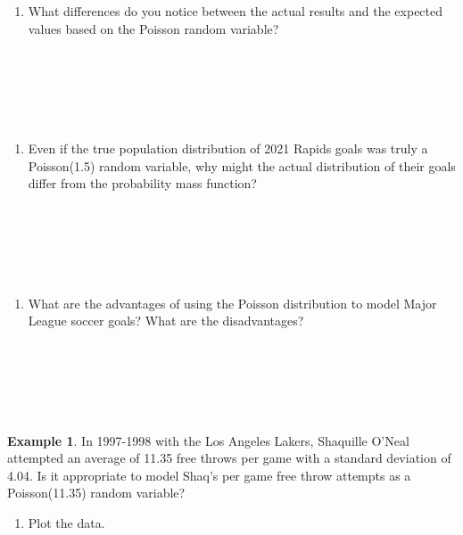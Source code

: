 \documentclass[
  11pt,
]{book}
\providecommand{\tightlist}{%
  \setlength{\itemsep}{0pt}\setlength{\parskip}{0pt}}
\theoremstyle{definition}
\theoremstyle{definition}
\newtheorem{example}{Example}[chapter]
\theoremstyle{definition}
\theoremstyle{definition}
\theoremstyle{remark}
\begin{document}
\begin{enumerate}
\def\labelenumi{(\alph{enumi})}
\setcounter{enumi}{1}
\tightlist
\item
  What differences do you notice between the actual results and the expected values based on the Poisson random variable?\\
  \strut \\
  \strut \\
  \strut \\
\end{enumerate}

\begin{enumerate}
\def\labelenumi{(\alph{enumi})}
\setcounter{enumi}{2}
\tightlist
\item
  Even if the true population distribution of 2021 Rapids goals was truly a Poisson(1.5) random variable, why might the actual distribution of their goals differ from the probability mass function?\\
  \strut \\
  \strut \\
  \strut \\
\end{enumerate}

\begin{enumerate}
\def\labelenumi{(\alph{enumi})}
\setcounter{enumi}{3}
\tightlist
\item
  What are the advantages of using the Poisson distribution to model Major League soccer goals? What are the disadvantages?\\
  \strut \\
  \strut \\
  \strut \\
\end{enumerate}

\begin{example}
In 1997-1998 with the Los Angeles Lakers, Shaquille O'Neal attempted an average of 11.35 free throws per game with a standard deviation of 4.04. Is it appropriate to model Shaq's per game free throw attempts as a Poisson(11.35) random variable?
\end{example}

\begin{enumerate}
\def\labelenumi{(\alph{enumi})}
\tightlist
\item
  Plot the data.
\end{enumerate}
\end{document}
